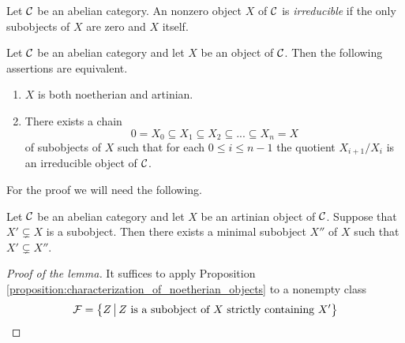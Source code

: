 \begin{definition}
Let ${\mathcal C}$ be an abelian category. An nonzero object $X$ of ${\mathcal C}$ is \textit{irreducible} if the only subobjects of $X$ are zero and $X$ itself.
\end{definition}

\begin{proposition}\label{proposition:characterization_of_objects_of_flength}
Let ${\mathcal C}$ be an abelian category and let $X$ be an object of ${\mathcal C}$. Then the following assertions are equivalent.
\begin{enumerate}[label=\emph{\textbf{(\roman*)}}, leftmargin=3.0em]
\item $X$ is both noetherian and artinian.
\item There exists a chain
$$0=X_0\subseteq X_1\subseteq X_2\subseteq ...\subseteq X_n = X$$
of subobjects of $X$ such that for each $0\leq i\leq n-1$ the quotient $X_{i+1}/X_i$ is an irreducible object of ${\mathcal C}$.
\end{enumerate}
\end{proposition}
\noindent
For the proof we will need the following.

\begin{lemma}\label{lemma:minimal_subobject_above_given_subobject}
Let ${\mathcal C}$ be an abelian category and let $X$ be an artinian object of ${\mathcal C}$. Suppose that $X'\subsetneq X$ is a subobject. Then there exists a minimal subobject $X''$ of $X$ such that $X'\subsetneq X''$.
\end{lemma}
\begin{proof}[Proof of the lemma]
It suffices to apply Proposition \ref{proposition:characterization_of_noetherian_objects} to a nonempty class
$${\mathcal F} = \big\{Z\,\big|\,Z\mbox{ is a subobject of }X\mbox{ strictly containing }X'\big\}$$
\end{proof}

